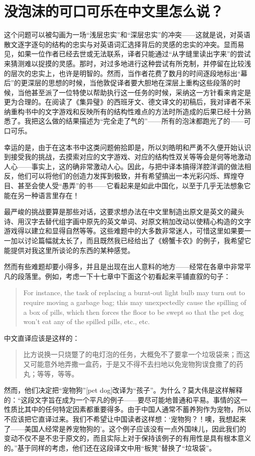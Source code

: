 \section*{没泡沫的可口可乐在中文里怎么说？}

这个问题可以被勾画为一场“浅层忠实”和“深层忠实”的冲突——这就是说，对英语散文逐字逐句的结构的忠实与对英语词汇选择背后的灵感的忠实的冲突。显而易见，如果一位作者已经去世或无法联系，译者只能通过“从字缝里读出字来”的尝试来猜测难以捉摸的灵感。那时，对过多地进行这种尝试有所克制，并停留在比较浅的层次的忠实上，也许是明智的。然而，当作者花费了数月的时间逐段地标出“幕后”的更深层的思想的时候，当他敦促译者要大胆地在深层上重构这些段落的时候，当他甚至派了一位特使以帮助执行这一任务的时候，采纳这一方针看来肯定是更为合理的。在阅读了《集异璧》的西班牙文、德文译文的初稿后，我对译者不采纳重构书中的文字游戏和反映所有的结构性难点的方法时所造成的后果已经十分熟悉了。我把这么做的结果描述为“完全走了气的”——所有的泡沫都跑光了的——可口可乐。

幸运的是，由于在这本书中这类问题俯拾即是，所以刘皓明和严勇不久便开始认识到接受我的挑战，去摸索对应的文字游戏、对应的结构性双关等等会是何等地激动人心——事实上，这的确非常激动人心。因此，与把中译本搞得洋腔洋调的做法相反，他们可以将他们的创造力发挥到极致，并有希望搞出一本光彩闪烁、辉煌夺目、甚至会使人受“愚弄”的书——它看起来是如此中国化，以至于几乎无法想象它能在另一种语言里存在！

最严峻的挑战要算是那些对话，这要求想办法在中文里制造出原文是英文的藏头诗、用汉字去替代组字画中原先的英文单词、对原文稍加改动以使精心构造的文字游戏得以建立和显得自然等等。这些难题中的大多数非常迷人，可惜这里如果要一一加以讨论篇幅就太长了，而且既然我已经给出了《螃蟹卡农》的例子，我希望它能提供对我这里所谈论的东西的某种感觉。

然而有些难题却要小得多，并且是出现在出人意料的地方——经常在各章中非常平凡的段落里。例如，考虑一下十七章中下面这个初看起来平铺直叙的句子：
\begin{quote}
For instance, the task of replacing a burnt-out light bulb may turn out to require moving a garbage bag; this may unexpectedly cause the spilling of a box of pills, which then forces the floor to be swept so that the pet dog won't eat any of the spilled pills, etc., etc.
\end{quote}
中文直译应该是这样的：
\begin{quote}
比方说换一只烧蹩了的电灯泡的任务，大概免不了要拿一个垃圾袋来；而这又可能意外地弄撒一盒药，于是又不得不去扫地以免宠物狗误食撒了的药丸；等等，等等。
\end{quote}
然而，他们决定把“宠物狗”[pet dog]改译为“孩子”。为什么？莫大伟是这样解释的：“这段文字旨在成为一个平凡的例子——要尽可能地普通和平易。事情的这一性质比其中的任何特定因素都重要得多。由于中国人通常不蓄养狗作为宠物，所以不应该把它直译过来。我们不希望让中国读者这样想：‘宠物狗？！噢，我想起来了——美国人经常是养宠物狗的’。这个例子应该没有一点外国味儿，因此我们的变动不仅不是不忠于原文的，而且实际上对于保持该例子的有用性是具有根本意义的。”基于同样的考虑，他们还在这段译文中用“板凳”替换了“垃圾袋”。

